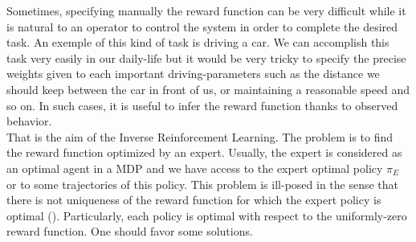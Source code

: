 \documentclass{article}
\begin{document}
Sometimes, specifying manually the reward function can be very difficult while it is natural to an operator to control the system in order to complete the desired task. An exemple of this kind of task is driving a car. We can accomplish this task very easily in our daily-life but it would be very tricky to specify the precise weights given to each important driving-parameters such as the distance we should keep between the car in front of us, or maintaining a reasonable speed and so on. In such cases, it is useful to infer the reward function thanks to observed behavior.\\
That is the aim of the Inverse Reinforcement Learning. The problem is to find the reward function optimized by an expert. Usually, the expert is considered as an optimal agent in a MDP and we have access to the expert optimal policy $\pi_E$ or to some trajectories of this policy.
This problem is ill-posed in the sense that there is not uniqueness of the reward function for which the expert policy is optimal (\cite{ng1999policy}). Particularly, each policy is optimal with respect to the uniformly-zero reward function. One should favor some solutions.
\end{document}
